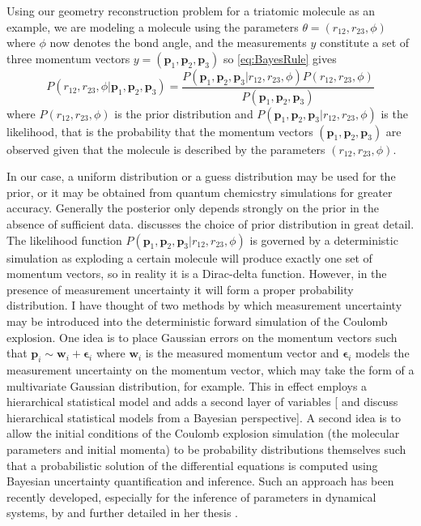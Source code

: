 Using our geometry reconstruction problem for a triatomic molecule as an example, we are modeling a molecule using the parameters $\theta = (r_{12}, r_{23}, \phi)$ where $\phi$ now denotes the bond angle, and the measurements $y$ constitute a set of three momentum vectors $y = (\mathbf{p}_1, \mathbf{p}_2, \mathbf{p}_3)$ so \eqref{eq:BayesRule} gives
\begin{equation} \label{eq:BayesGeometry}
  P(r_{12}, r_{23}, \phi|\mathbf{p}_1, \mathbf{p}_2, \mathbf{p}_3) = \frac{P(\mathbf{p}_1, \mathbf{p}_2, \mathbf{p}_3|r_{12}, r_{23}, \phi) P(r_{12}, r_{23}, \phi)}{P(\mathbf{p}_1, \mathbf{p}_2, \mathbf{p}_3)}
\end{equation}
where $P(r_{12}, r_{23}, \phi)$ is the prior distribution and $P(\mathbf{p}_1, \mathbf{p}_2, \mathbf{p}_3|r_{12}, r_{23}, \phi)$ is the likelihood, that is the probability that the momentum vectors $(\mathbf{p}_1, \mathbf{p}_2, \mathbf{p}_3)$ are observed given that the molecule is described by the parameters $(r_{12}, r_{23}, \phi)$.

In our case, a uniform distribution or a guess distribution may be used for the prior, or it may be obtained from quantum chemicstry simulations for greater accuracy. Generally the posterior only depends strongly on the prior in the absence of sufficient data. \citet{Gelman14} discusses the choice of prior distribution in great detail. The likelihood function $P(\mathbf{p}_1, \mathbf{p}_2, \mathbf{p}_3|r_{12}, r_{23}, \phi)$ is governed by a deterministic simulation as exploding a certain molecule will produce exactly one set of momentum vectors, so in reality it is a Dirac-delta function. However, in the presence of measurement uncertainty it will form a proper probability distribution. I have thought of two methods by which measurement uncertainty may be introduced into the deterministic forward simulation of the Coulomb explosion. One idea is to place Gaussian errors on the momentum vectors such that $\mathbf{p}_i \sim \mathbf{w}_i + \bm{\epsilon}_i$ where $\mathbf{w}_i$ is the measured momentum vector and $\bm{\epsilon}_i$ models the measurement uncertainty on the momentum vector, which may take the form of a multivariate Gaussian distribution, for example. This in effect employs a hierarchical statistical model and adds a second layer of variables [\citet[ch. 9]{Kruschke14} and \citet[ch. 5]{Gelman14} discuss hierarchical statistical models from a Bayesian perspective]. A second idea is to allow the initial conditions of the Coulomb explosion simulation (the molecular parameters and initial momenta) to be probability distributions themselves such that a probabilistic solution of the differential equations is computed using Bayesian uncertainty quantification and inference. Such an approach has been recently developed, especially for the inference of parameters in dynamical systems, by \citet{Chkrebtii16} and further detailed in her thesis \citep{Chkrebtii13}.

